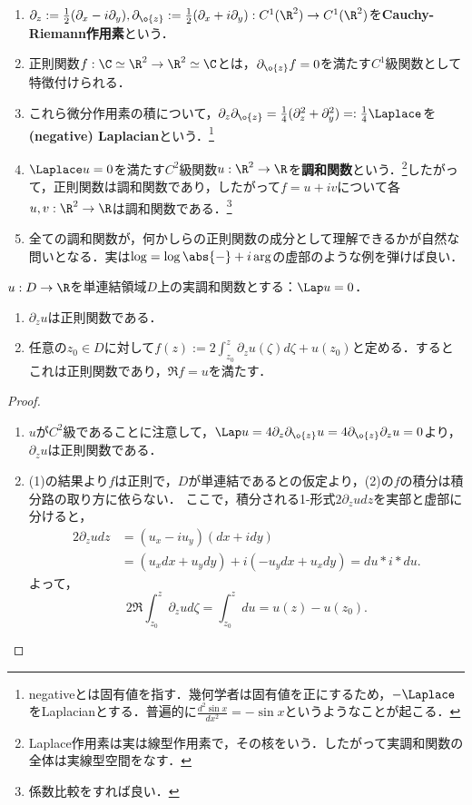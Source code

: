 \documentclass[uplatex, dvipdfmx]{jsreport}
\begin{document}
\begin{definition}\mbox{}
    \begin{enumerate}
        \item $\partial_z:=\frac{1}{2}(\partial_x-i\partial_y),\partial_{\o{z}}:=\frac{1}{2}(\partial_x+i\partial_y):C^1(\R^2)\to C^1(\R^2)$を\textbf{Cauchy-Riemann作用素}という．
        \item 正則関数$f:\C\simeq\R^2\to\R^2\simeq\C$とは，$\partial_{\o{z}}f=0$を満たす$C^1$級関数として特徴付けられる．
        \item これら微分作用素の積について，$\partial_z\partial_{\o{z}}=\frac{1}{4}(\partial_z^2+\partial_y^2)=:\frac{1}{4}\Laplace$を\textbf{(negative) Laplacian}という．\footnote{negativeとは固有値を指す．幾何学者は固有値を正にするため，$-\Laplace$をLaplacianとする．普遍的に$\frac{d^2\sin x}{dx^2}=-\sin x$というようなことが起こる．}
        \item $\Laplace u=0$を満たす$C^2$級関数$u:\R^2\to\R$を\textbf{調和関数}という．\footnote{Laplace作用素は実は線型作用素で，その核をいう．したがって実調和関数の全体は実線型空間をなす．}したがって，正則関数は調和関数であり，したがって$f=u+iv$について各$u,v:\R^2\to\R$は調和関数である．\footnote{係数比較をすれば良い．}
        \item 全ての調和関数が，何かしらの正則関数の成分として理解できるかが自然な問いとなる．実は$\log=\log\abs{-}+i\arg$の虚部のような例を弾けば良い．
    \end{enumerate}
\end{definition}

\begin{theorem}
    $u:D\to\R$を単連結領域$D$上の実調和関数とする：$\Lap u=0$．
    \begin{enumerate}
        \item $\partial_zu$は正則関数である．
        \item 任意の$z_0\in D$に対して$f(z):=2\int^z_{z_0}\partial_zu(\zeta)d\zeta+u(z_0)$と定める．するとこれは正則関数であり，$\Re f=u$を満たす．
    \end{enumerate}
\end{theorem}
\begin{proof}\mbox{}
    \begin{enumerate}
        \item $u$が$C^2$級であることに注意して，$\Lap u=4\partial_z\partial_{\o{z}}u=4\partial_{\o{z}}\partial_zu=0$より，$\partial_zu$は正則関数である．
        \item (1)の結果より$f$は正則で，$D$が単連結であるとの仮定より，(2)の$f$の積分は積分路の取り方に依らない．
        ここで，積分される1-形式$2\partial_zudz$を実部と虚部に分けると，
        \begin{align*}
            2\partial_zudz&=(u_x-iu_y)(dx+idy)\\
            &=(u_xdx+u_ydy)+i(-u_ydx+u_xdy)=du*i*du.
        \end{align*}
        よって，
        \[2\Re\int^z_{z_0}\partial_zud\zeta=\int^z_{z_0}du=u(z)-u(z_0).\]
    \end{enumerate}
\end{proof}
\end{document}
